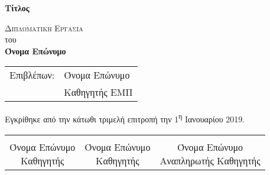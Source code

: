 \begin{titlepage}
	
	\begin{center}
	
	\Huge
    \textbf{Τίτλος}
        
    \vspace{5cm}
    \Large
    \textsc{Διπλωματικη Εργασια}\\
    του\\

    \LARGE
    \textbf{Όνομα Επώνυμο}
    
    \vfill
    \end{center}
    
    \begin{tabular}{ll}
		Επιβλέπων: & Όνομα Επώνυμο \\
		 & Καθηγητής ΕΜΠ
	\end{tabular}
	
	\vspace{1.5cm}
    
    Εγκρίθηκε από την κάτωθι τριμελή επιτροπή την 1\textsuperscript{η} Ιανουαρίου 2019.
    
    \vspace{2cm}
	
	\begin{center}
	\noindent\begin{tabular}{ccc}
		\makebox[0.3\textwidth]{\hrulefill} & 
		\makebox[0.3\textwidth]{\hrulefill} & 
		\makebox[0.3\textwidth]{\hrulefill} \\

		\specialcell{Όνομα Επώνυμο \\ Καθηγητής} & 
		\specialcell{Όνομα Επώνυμο \\ Καθηγητής} & 
		\specialcell{Όνομα Επώνυμο \\ Αναπληρωτής Καθηγητής} \\ [8ex]%
	\end{tabular}
	\end{center}
	
\end{titlepage}